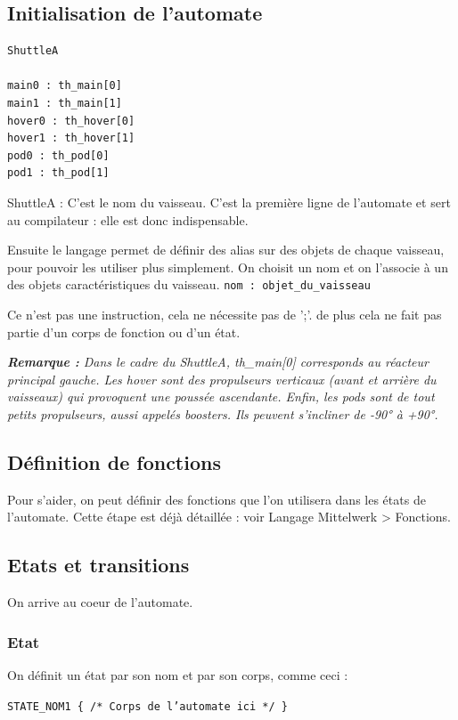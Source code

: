 \documentclass[a4paper,11pt]{article}
\begin{document}
\subsection{Initialisation de l'automate}

\begin{verbatim}
ShuttleA

main0 : th_main[0]
main1 : th_main[1]
hover0 : th_hover[0]
hover1 : th_hover[1]
pod0 : th_pod[0]
pod1 : th_pod[1]
\end{verbatim}

ShuttleA : C'est le nom du vaisseau. C'est la première ligne de l'automate et sert au compilateur : elle est donc indispensable.

Ensuite le langage permet de définir des alias sur des objets de chaque vaisseau, pour pouvoir les utiliser plus simplement. On choisit un nom et on l'associe à un des objets caractéristiques du vaisseau. 
\texttt{nom : objet\_du\_vaisseau}

Ce n'est pas une instruction, cela ne nécessite pas de ';'. de plus cela ne fait pas partie d'un corps de fonction ou d'un état.

\textit{\textbf{Remarque : }Dans le cadre du ShuttleA, th\_main[0] corresponds au réacteur principal gauche. 
Les hover sont des propulseurs verticaux (avant et arrière du vaisseaux) qui provoquent une poussée ascendante. Enfin, les pods sont de tout petits propulseurs, aussi appelés boosters. Ils peuvent s'incliner de -90° à +90°.}

\subsection{Définition de fonctions}
Pour s'aider, on peut définir des fonctions que l'on utilisera dans les états de l'automate. Cette étape est déjà détaillée : voir Langage Mittelwerk > Fonctions.

\subsection{Etats et transitions}

On arrive au coeur de l'automate. 
\subsubsection{Etat}

On définit un état par son nom et par son corps, comme ceci :

\texttt{STATE\_NOM1 \{
	/* Corps de l'automate ici */
\}}
\end{document}
